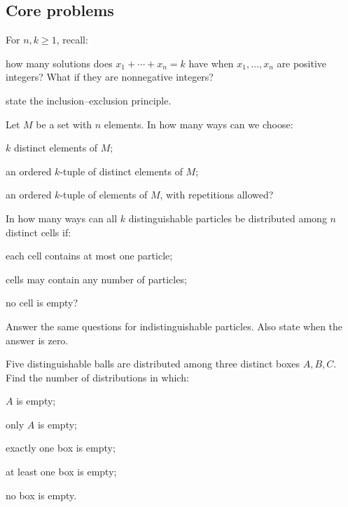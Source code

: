 \subsection*{Core problems}
\begin{problembook}
For $n,k\ge 1$, recall:
\begin{enumeratea}
  \item how many solutions does $x_1+\cdots+x_n=k$ have when $x_1,\dots,x_n$
  are positive integers? What if they are nonnegative integers?
  \item state the inclusion--exclusion principle.
\end{enumeratea}
\end{problembook}
\begin{problembook}
Let $M$ be a set with $n$ elements. In how many ways can we choose:
\begin{enumeratea}
  \item $k$ distinct elements of $M$;
  \item an ordered $k$-tuple of distinct elements of $M$;
  \item an ordered $k$-tuple of elements of $M$, with repetitions allowed?
\end{enumeratea}
\end{problembook}
\begin{problem}
In how many ways can all $k$ distinguishable particles be distributed among $n$
distinct cells if:
\begin{enumeratea}
  \item each cell contains at most one particle;
  \item cells may contain any number of particles;
  \item no cell is empty?
\end{enumeratea}
Answer the same questions for indistinguishable particles. Also state when the answer is zero.
\end{problem}
\begin{problem}
Five distinguishable balls are distributed among three distinct boxes $A,B,C$.
Find the number of distributions in which:
\begin{enumeratea}
  \item $A$ is empty;
  \item only $A$ is empty;
  \item exactly one box is empty;
  \item at least one box is empty;
  \item no box is empty.
\end{enumeratea}
\end{problem}
